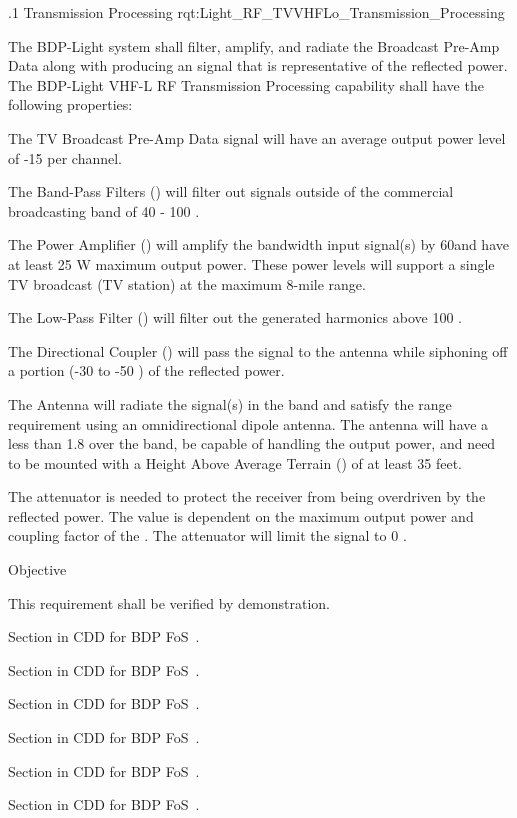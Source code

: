 
\ONERQMTV
{\RqtNumberBase.1}
{\ThisSubSegment Transmission Processing}
{rqt:Light_RF_TVVHFLo_Transmission_Processing}
{
The BDP-Light system shall filter, amplify, and radiate the \TVVHFLow \RF Broadcast Pre-Amp Data along with producing an \RF signal that is representative of the reflected \RF power. The BDP-Light VHF-L RF Transmission Processing capability shall have the following properties:
\begin{my_enumerate}
	\item The TV \RF Broadcast Pre-Amp Data signal will have an average output power level of -15 \dBm per \RF channel.
	\item The Band-Pass Filters (\BPF) will filter out signals outside of the commercial \FM broadcasting band of 40 - 100 \MHz.
	\item The \RF Power Amplifier (\PA) will amplify the \TVVHFLow bandwidth input signal(s) by 60\dB and have at least 25 W maximum output power. These power levels will support a single TV broadcast (TV station) at the maximum 8-mile range.
	\item The Low-Pass Filter (\LPF) will filter out the generated harmonics above 100 \MHz.
	\item The Directional Coupler (\DC) will pass the \RF signal to the antenna while siphoning off a portion (-30 to -50 \dB) of the reflected power.
	\item The Antenna will radiate the \RF signal(s) in the \TVVHFLow band and satisfy the range requirement using an omnidirectional dipole antenna. The antenna will have a \VSWR less than 1.8 over the \TVVHFLow band, be capable of handling the \PA output power, and need to be mounted with a Height Above Average Terrain (\HAAT) of at least 35 feet.
	\item The attenuator is needed to protect the receiver from being overdriven by the reflected power. The value is dependent on the maximum \PA output power and coupling factor of the \DC. The attenuator will limit the signal to 0 \dBm.
\end{my_enumerate}
}
{
	\item [Phase 1]  Objective
}
{This requirement shall be verified by demonstration.}
{
	\item [5.1.1] Section in CDD for BDP FoS~\cite{ref__BDP_FOS_CDD}.
	\item [5.1.2] Section in CDD for BDP FoS~\cite{ref__BDP_FOS_CDD}.
	\item [5.1.4] Section in CDD for BDP FoS~\cite{ref__BDP_FOS_CDD}.
	\item [5.5.1] Section in CDD for BDP FoS~\cite{ref__BDP_FOS_CDD}.
	\item [5.5.3] Section in CDD for BDP FoS~\cite{ref__BDP_FOS_CDD}.
	\item [5.5.4] Section in CDD for BDP FoS~\cite{ref__BDP_FOS_CDD}.
}
